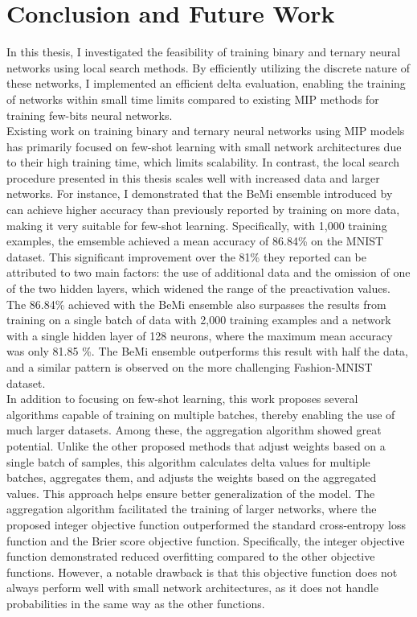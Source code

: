 \section{Conclusion and Future Work}
In this thesis, I investigated the feasibility of training binary and ternary neural networks using local search methods. By efficiently utilizing the discrete nature of these networks, I implemented an efficient delta evaluation, enabling the training of networks within small time limits compared to existing MIP methods for training few-bits neural networks. \\

\noindent Existing work on training binary and ternary neural networks using MIP models has primarily focused on few-shot learning with small network architectures due to their high training time, which limits scalability. In contrast, the local search procedure presented in this thesis scales well with increased data and larger networks. For instance, I demonstrated that the BeMi ensemble introduced by \cite{ambrogio2023} can achieve higher accuracy than previously reported by training on more data, making it very suitable for few-shot learning. Specifically, with 1,000 training examples, the emsemble achieved a mean accuracy of 86.84\% on the MNIST dataset. This significant improvement over the 81\% they reported can be attributed to two main factors: the use of additional data and the omission of one of the two hidden layers, which widened the range of the preactivation values. The 86.84\% achieved with the BeMi ensemble also surpasses the results from training on a single batch of data with 2,000 training examples and a network with a single hidden layer of 128 neurons, where the maximum mean accuracy was only 81.85 \%. The BeMi ensemble outperforms this result with half the data, and a similar pattern is observed on the more challenging Fashion-MNIST dataset. \\

\noindent In addition to focusing on few-shot learning, this work proposes several algorithms capable of training on multiple batches, thereby enabling the use of much larger datasets. Among these, the aggregation algorithm showed great potential. Unlike the other proposed methods that adjust weights based on a single batch of samples, this algorithm calculates delta values for multiple batches, aggregates them, and adjusts the weights based on the aggregated values. This approach helps ensure better generalization of the model. The aggregation algorithm facilitated the training of larger networks, where the proposed integer objective function outperformed the standard cross-entropy loss function and the Brier score objective function. Specifically, the integer objective function demonstrated reduced overfitting compared to the other objective functions. However, a notable drawback is that this objective function does not always perform well with small network architectures, as it does not handle probabilities in the same way as the other functions. \\

